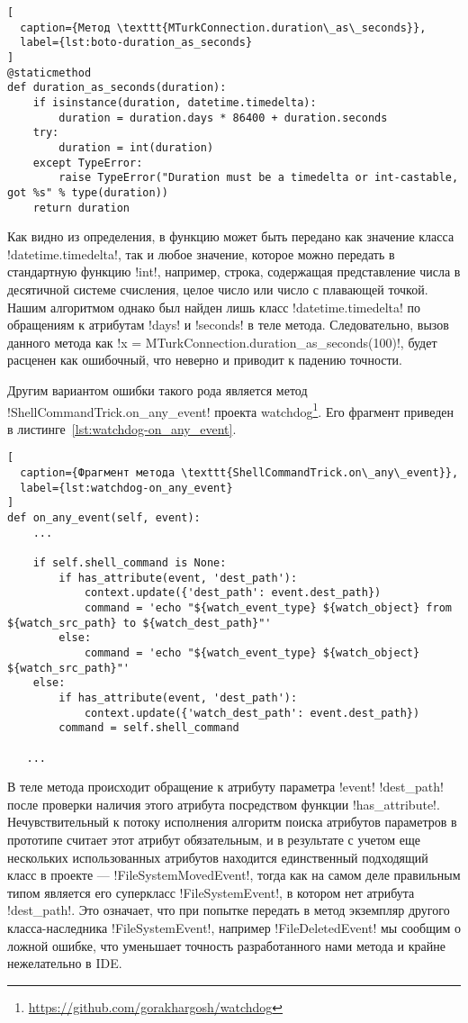 \begin{lstlisting}[
  caption={Метод \texttt{MTurkConnection.duration\_as\_seconds}},
  label={lst:boto-duration_as_seconds}
]
@staticmethod
def duration_as_seconds(duration):
    if isinstance(duration, datetime.timedelta):
        duration = duration.days * 86400 + duration.seconds
    try:
        duration = int(duration)
    except TypeError:
        raise TypeError("Duration must be a timedelta or int-castable, got %s" % type(duration))
    return duration
\end{lstlisting}

Как видно из определения, в функцию может быть передано как значение класса
!datetime.timedelta!, так и любое значение, которое можно передать в стандартную
функцию !int!, например, строка, содержащая представление числа в десятичной
системе счисления, целое число или число с плавающей точкой. Нашим
алгоритмом однако был найден лишь класс !datetime.timedelta! по обращениям к
атрибутам !days! и !seconds! в теле метода. Следовательно, вызов данного метода
как !x = MTurkConnection.duration_as_seconds(100)!, будет расценен как
ошибочный, что неверно и приводит к падению точности.

\newpage

Другим вариантом ошибки такого рода является метод !ShellCommandTrick.on_any_event!
проекта watchdog\footnote{\url{https://github.com/gorakhargosh/watchdog}}. Его
фрагмент приведен в листинге~\ref{lst:watchdog-on_any_event}.

\begin{lstlisting}[
  caption={Фрагмент метода \texttt{ShellCommandTrick.on\_any\_event}},
  label={lst:watchdog-on_any_event}
]
def on_any_event(self, event):
    ...

    if self.shell_command is None:
        if has_attribute(event, 'dest_path'):
            context.update({'dest_path': event.dest_path})
            command = 'echo "${watch_event_type} ${watch_object} from ${watch_src_path} to ${watch_dest_path}"'
        else:
            command = 'echo "${watch_event_type} ${watch_object} ${watch_src_path}"'
    else:
        if has_attribute(event, 'dest_path'):
            context.update({'watch_dest_path': event.dest_path})
        command = self.shell_command

   ... 
\end{lstlisting}

В теле метода происходит обращение к атрибуту параметра !event! !dest_path!
после проверки наличия этого атрибута посредством функции !has_attribute!.
Нечувствительный к потоку исполнения алгоритм поиска атрибутов параметров в
прототипе считает этот атрибут обязательным, и в результате с учетом еще
нескольких использованных атрибутов находится единственный подходящий класс в
проекте --- !FileSystemMovedEvent!, тогда как на самом деле правильным типом
является его суперкласс !FileSystemEvent!, в котором нет атрибута !dest_path!.
Это означает, что при попытке передать в метод экземпляр другого
класса-наследника !FileSystemEvent!, например !FileDeletedEvent! мы сообщим о
ложной ошибке, что уменьшает точность разработанного нами метода и крайне
нежелательно в IDE.

